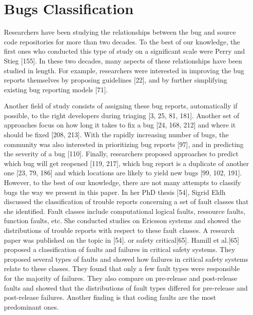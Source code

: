 \documentclass[12pt]{report}
\begin{document}
\section{Bugs Classification}\label{bugs-classification}

Researchers have been studying the relationships between the bug and
source code repositories for more than two decades. To the best of our
knowledge, the first ones who conducted this type of study on a
significant scale were Perry and Stieg {[}155{]}. In these two decades,
many aspects of these relationships have been studied in length. For
example, researchers were interested in improving the bug reports
themselves by proposing guidelines {[}22{]}, and by further simplifying
existing bug reporting models {[}71{]}.

Another field of study consists of assigning these bug reports,
automatically if possible, to the right developers during triaging {[}3,
25, 81, 181{]}. Another set of approaches focus on how long it takes to
fix a bug {[}24, 168, 212{]} and where it should be fixed {[}208,
213{]}. With the rapidly increasing number of bugs, the community was
also interested in prioritizing bug reports {[}97{]}, and in predicting
the severity of a bug {[}110{]}. Finally, researchers proposed
approaches to predict which bug will get reopened {[}119, 217{]}, which
bug report is a duplicate of another one {[}23, 79, 186{]} and which
locations are likely to yield new bugs {[}99, 102, 191{]}. However, to
the best of our knowledge, there are not many attempts to classify bugs
the way we present in this paper. In her PhD thesis {[}54{]}, Sigrid
Eldh discussed the classification of trouble reports concerning a set of
fault classes that she identified. Fault classes include computational
logical faults, ressource faults, function faults, etc. She conducted
studies on Ericsson systems and showed the distributions of trouble
reports with respect to these fault classes. A research paper was
published on the topic in {[}54{]}. or safety critical{[}65{]}. Hamill
et al.{[}65{]} proposed a classification of faults and failures in
critical safety systems. They proposed several types of faults and
showed how failures in critical safety systems relate to these classes.
They found that only a few fault types were responsible for the majority
of failures. They also compare on pre-release and post-release faults
and showed that the distributions of fault types differed for
pre-release and post-release failures. Another finding is that coding
faults are the most predominant ones.
\end{document}
